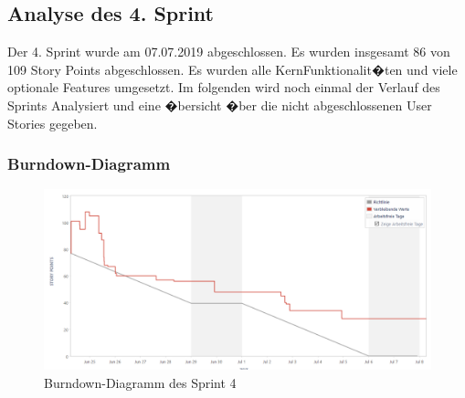 \documentclass[12pt, titlepage]{scrartcl}
\begin{document}
		\subsection{Analyse des 4. Sprint}
			Der 4. Sprint wurde am 07.07.2019 abgeschlossen. Es wurden insgesamt 86 von 109 Story Points abgeschlossen. Es wurden alle KernFunktionalit�ten und viele optionale Features umgesetzt. Im folgenden wird noch einmal der Verlauf des Sprints Analysiert und eine �bersicht �ber die nicht abgeschlossenen User Stories gegeben. 
		
			\subsubsection{Burndown-Diagramm}
		
			\begin{figure}[H] 
				\centering
				\includegraphics[width=1\textwidth]{BurndownChart_Sprint4.PNG}
				\caption{Burndown-Diagramm des Sprint 4}
				\label{BurndownSprint4}
			\end{figure}
\end{document}
